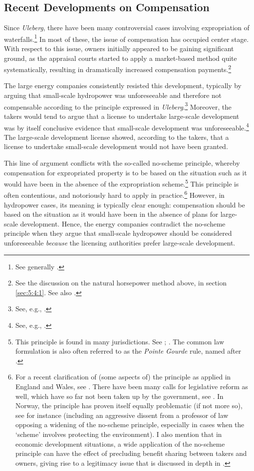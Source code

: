 \subsection{Recent Developments on Compensation}\label{sec:5:5:3}

Since {\it Uleberg}, there have been many controversial cases involving expropriation of waterfalls.\footnote{See generally \cite{larsen06,larsen08,larsen12}.} In most of these, the issue of compensation has occupied center stage. With respect to this issue, owners initially appeared to be gaining significant ground, as the appraisal courts started to apply a market-based method quite systematically, resulting in dramatically increased compensation payments.\footnote{See the discussion on the natural horsepower method above, in section \ref{sec:5:4:1}. See also \cite[278-290]{hauge15}.}

The large energy companies consistently resisted this development, typically by arguing that small-scale hydropower was unforeseeable and therefore not compensable according to the principle expressed in {\it Uleberg}.\footnote{See, e.g., \cite{klovtveit11,otra10,otra13}.} Moreover, the takers would tend to argue that a license to undertake large-scale development was by itself conclusive evidence that small-scale development was unforeseeable.\footnote{See, e.g., \cite[17]{otra10}.} The large-scale development license showed, according to the takers, that a license to undertake small-scale development would not have been granted.

This line of argument conflicts with the so-called no-scheme principle, whereby compensation for expropriated property is to be based on the situation such as it would have been in the absence of the expropriation scheme.\footnote{This principle is found in many jurisdictions. See \cite[20-21]{sluysmans15}; \cite[1722]{lehavi07}. The common law formulation is also often referred to as the {\it Pointe Gourde} rule, named after \cite{gourde47}.} This principle is often contentious, and notoriously hard to apply in practice.\footnote{For a recent clarification of (some aspects of) the principle as applied in England and Wales, see \cite{waters04,spirerose09}. There have been many calls for legislative reform as well, which have so far not been taken up by the government, see \cite[152]{waring15}. In Norway, the principle has proven itself equally problematic (if not more so), see for instance \cite{nou03} (including an aggressive dissent from a professor of law opposing a widening of the no-scheme principle, especially in cases when the `scheme' involves protecting the environment). I also mention that in economic development situations, a wide application of the no-scheme principle can have the effect of precluding benefit sharing between takers and owners, giving rise to a legitimacy issue that is discussed in depth in \cite{dyrkolbotn15a}.} However, in hydropower cases, its meaning is typically clear enough: compensation should be based on the situation as it would have been in the absence of plans for large-scale development. Hence, the energy companies contradict the no-scheme principle when they argue that small-scale hydropower should be considered unforeseeable {\it because} the licensing authorities prefer large-scale development.

